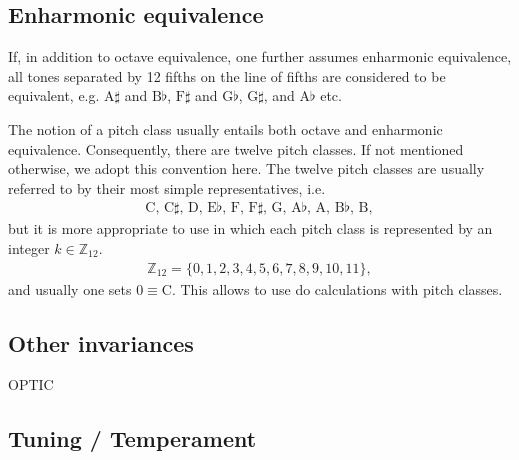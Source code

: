\documentclass[letterpaper,10pt,english]{sphinxmanual}
\begin{document}
\subsection{Enharmonic equivalence}
\label{\detokenize{1_fundamentals:enharmonic-equivalence}}
If, in addition to octave equivalence, one further assumes enharmonic equivalence,
all tones separated by 12 fifths on the line of fifths
are considered to be equivalent, e.g. \(\text{A}\sharp\) and \(\text{B}\flat\),
\(\text{F}\sharp\) and \(\text{G}\flat\), \(\text{G}\sharp\), and \(\text{A}\flat\) etc.

The notion of a pitch class usually entails both octave and enharmonic equivalence.
Consequently, there are twelve pitch classes. If not mentioned otherwise, we adopt this convention here.
The twelve pitch classes are usually referred to by their most simple representatives, i.e.
\begin{equation*}
\begin{split}\text{C, C$\sharp$, D, E$\flat$, F, F$\sharp$, G, A$\flat$, A, B$\flat$, B},\end{split}
\end{equation*}
but it is more appropriate to use  in which each pitch class is represented
by an integer \(k \in \mathbb{Z}_{12}\).
\begin{equation*}
\begin{split}\mathbb{Z}_{12}=\{0, 1, 2, 3, 4, 5, 6, 7, 8, 9, 10, 11\},\end{split}
\end{equation*}
and usually one sets \(0\equiv \text{C}\). This allows to use 
do calculations with pitch classes.


\subsection{Other invariances}
\label{\detokenize{1_fundamentals:other-invariances}}
OPTIC


\subsection{Tuning / Temperament}
\label{\detokenize{1_fundamentals:tuning-temperament}}
\end{document}
